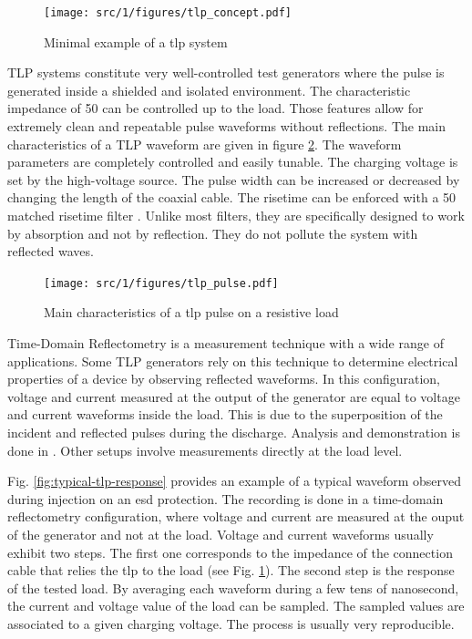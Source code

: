\begin{figure}[!h]
  \centering
  \texttt{[image: src/1/figures/tlp\_concept.pdf]}
  \caption{Minimal example of a \gls{tlp} system}
  \label{tlp_concept}
\end{figure}

TLP systems constitute very well-controlled test generators where the pulse is generated inside a shielded and isolated environment.
The characteristic impedance of 50\textOmega{} can be controlled up to the load.
Those features allow for extremely clean and repeatable pulse waveforms without reflections.
The main characteristics of a TLP waveform are given in figure \ref{tlp_pulse}.
The waveform parameters are completely controlled and easily tunable.
The charging voltage is set by the high-voltage source.
The pulse width can be increased or decreased by changing the length of the coaxial cable.
The risetime can be enforced with a 50\textOmega{} matched risetime filter \cite{cao-risetime-filter, gaussian-lpf}.
Unlike most filters, they are specifically designed to work by absorption and not by reflection.
They do not pollute the system with reflected waves.

\begin{figure}[!h]
  \centering
  \texttt{[image: src/1/figures/tlp\_pulse.pdf]}
  \caption{Main characteristics of a \gls{tlp} pulse on a resistive load}
  \label{tlp_pulse}
\end{figure}

Time-Domain Reflectometry is a measurement technique with a wide range of applications.
Some TLP generators rely on this technique to determine electrical properties of a device by observing reflected waveforms.
In this configuration, voltage and current measured at the output of the generator are equal to voltage and current waveforms inside the load.
This is due to the superposition of the incident and reflected pulses during the discharge.
Analysis and demonstration is done in \cite{phd-monnereau}.
Other setups involve measurements directly at the load level.

Fig. \ref{fig:typical-tlp-response} provides an example of a typical waveform observed during injection on an \gls{esd} protection.
The recording is done in a time-domain reflectometry configuration, where voltage and current are measured at the ouput of the generator and not at the load.
Voltage and current waveforms usually exhibit two steps.
The first one corresponds to the impedance of the connection cable that relies the \gls{tlp} to the load (see Fig. \ref{tlp_concept}).
The second step is the response of the tested load.
By averaging each waveform during a few tens of nanosecond, the current and voltage value of the load can be sampled.
The sampled values are associated to a given charging voltage.
The process is usually very reproducible.

